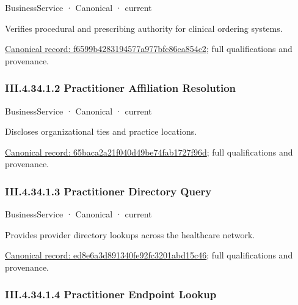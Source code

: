 \label{element:f6599b4283194577a977bfc86ea854c2}
{\small BusinessService · Canonical · current}\par

Verifies procedural and prescribing authority for clinical ordering systems.


{\footnotesize \href{../../../../continuum/business/business-service/f6599b4283194577a977bfc86ea854c2.md}{Canonical record: f6599b4283194577a977bfc86ea854c2}; full qualifications and provenance.}\par
\subsubsection*{III.4.34.1.2 Practitioner Affiliation Resolution}
\label{navigation:III.4.34.1.2}

\label{element:65baca2a21f040d49be74fab1727f96d}
{\small BusinessService · Canonical · current}\par

Discloses organizational ties and practice locations.


{\footnotesize \href{../../../../continuum/business/business-service/65baca2a21f040d49be74fab1727f96d.md}{Canonical record: 65baca2a21f040d49be74fab1727f96d}; full qualifications and provenance.}\par
\subsubsection*{III.4.34.1.3 Practitioner Directory Query}
\label{navigation:III.4.34.1.3}

\label{element:ed8e6a3d891340fe92fc3201abd15c46}
{\small BusinessService · Canonical · current}\par

Provides provider directory lookups across the healthcare network.


{\footnotesize \href{../../../../continuum/business/business-service/ed8e6a3d891340fe92fc3201abd15c46.md}{Canonical record: ed8e6a3d891340fe92fc3201abd15c46}; full qualifications and provenance.}\par
\subsubsection*{III.4.34.1.4 Practitioner Endpoint Lookup}
\label{navigation:III.4.34.1.4}


